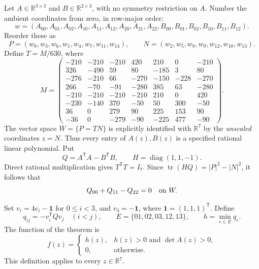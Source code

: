 \documentclass[11pt]{article}
\newcommand{\R}{\mathbb R}
\newcommand{\tr}{\operatorname{tr}}
\newcommand{\transpose}{^{\mathsf T}}
\DeclareMathOperator{\diag}{diag}
\begin{document}
Let $A\in\R^{3\times3}$ and $B\in\R^{2\times3}$, with no symmetry
restriction on $A$. Number the ambient coordinates from zero, in row-major
order:
\[
w=(A_{00},A_{01},A_{02},A_{10},A_{11},A_{12},A_{20},A_{21},A_{22},
 B_{00},B_{01},B_{02},B_{10},B_{11},B_{12}).
\]
Reorder these as
\[
 P=(w_0,w_3,w_6,w_1,w_4,w_7,w_{11},w_{14}),\qquad
 N=(w_2,w_5,w_8,w_9,w_{12},w_{10},w_{13}).
\]
Define $T=M/630$, where
\begin{equation}\label{eq:M}
M=\begin{pmatrix}
-210&-210&-210&420&210&0&-210\\
326&-490&59&80&-185&3&80\\
-276&-210&66&-270&-150&-228&-270\\
266&-70&-91&-280&385&63&-280\\
-210&-210&-210&-210&210&0&420\\
-230&-140&370&-50&50&300&-50\\
36&0&279&90&225&153&90\\
-36&0&-279&-90&-225&477&-90
\end{pmatrix}.
\end{equation}
The vector space $W=\{P=TN\}$ is explicitly identified with $\R^7$ by
the \emph{unscaled} coordinates $z=N$. Thus every entry of $A(z),B(z)$
is a specified rational linear polynomial. Put
\[
 Q=A\transpose A-B\transpose B,\qquad H=\diag(1,1,-1).
\]
Direct rational multiplication gives $T\transpose T=I_7$. Since
$\tr(HQ)=|P|^2-|N|^2$, it follows that
\begin{equation}\label{eq:trace}
 Q_{00}+Q_{11}-Q_{22}=0\quad\hbox{on }W.
\end{equation}

Set $v_i=4e_i-\mathbf1$ for $0\leq i<3$, and $v_3=-\mathbf1$, where
$\mathbf1=(1,1,1)\transpose$. Define
\[
 q_{ij}=-v_i\transpose Qv_j\quad(i<j),\qquad
 E=\{01,02,03,12,13\},\qquad h=\min_{e\in E}q_e.
\]
The function of the theorem is
\begin{equation}\label{eq:f}
 f(z)=\begin{cases}h(z),&h(z)>0\text{ and }\det A(z)>0,\\
                    0,&\text{otherwise}.
       \end{cases}
\end{equation}
This definition applies to every $z\in\R^7$.
\end{document}
